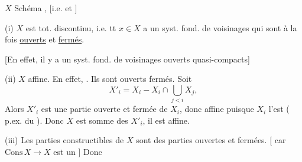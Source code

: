 $X$ Schéma , [i.e.  et  ]

(i) $X$ est tot. discontinu, 
i.e. tt $x\in X$ a un syst. fond. de voisinages qui sont à la fois \uline{ouverts} et \uline{fermés}.

[En effet, il y a un syst. fond. de voisinages ouverts quasi-compacts]

(ii) $X$  affine. En effet,  .  Ils sont ouverts  fermés. Soit
\[
X'_i=X_i-X_i\cap\bigcup_{j<i}X_j,
\]
Alors $X'_i$ est une partie ouverte et fermée de $X_i$, donc affine puisque $X_i$ l'est ( p.ex. du   ). Donc $X$ est  somme des $X'_i$, il est affine.

(iii) Les parties constructibles de $X$ sont des parties ouvertes et fermées. [  car $\mathrm{Cons}\,X\to X$ est un  ] Donc
